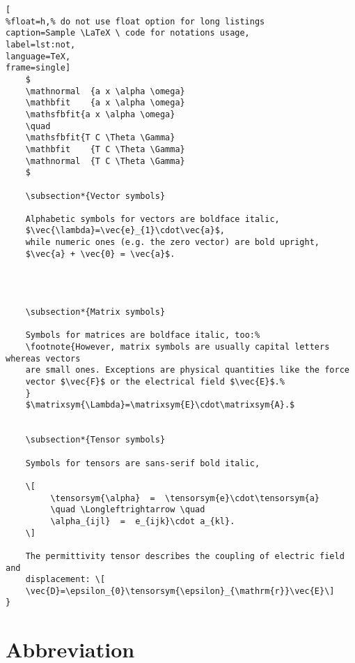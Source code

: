\begin{lstlisting}[
%float=h,% do not use float option for long listings
caption=Sample \LaTeX \ code for notations usage, 
label=lst:not,
language=TeX,
frame=single]
	$
	\mathnormal  {a x \alpha \omega}
	\mathbfit    {a x \alpha \omega}
	\mathsfbfit{a x \alpha \omega}
	\quad
	\mathsfbfit{T C \Theta \Gamma}
	\mathbfit    {T C \Theta \Gamma}
	\mathnormal  {T C \Theta \Gamma}
	$

	\subsection*{Vector symbols}

	Alphabetic symbols for vectors are boldface italic,
	$\vec{\lambda}=\vec{e}_{1}\cdot\vec{a}$,
	while numeric ones (e.g. the zero vector) are bold upright,
	$\vec{a} + \vec{0} = \vec{a}$.




	\subsection*{Matrix symbols}

	Symbols for matrices are boldface italic, too:%
	\footnote{However, matrix symbols are usually capital letters whereas vectors
	are small ones. Exceptions are physical quantities like the force
	vector $\vec{F}$ or the electrical field $\vec{E}$.%
	}
	$\matrixsym{\Lambda}=\matrixsym{E}\cdot\matrixsym{A}.$


	\subsection*{Tensor symbols}

	Symbols for tensors are sans-serif bold italic,

	\[
		 \tensorsym{\alpha}  =  \tensorsym{e}\cdot\tensorsym{a}
		 \quad \Longleftrightarrow \quad
		 \alpha_{ijl}  =  e_{ijk}\cdot a_{kl}.
	\]

	The permittivity tensor describes the coupling of electric field and
	displacement: \[
	\vec{D}=\epsilon_{0}\tensorsym{\epsilon}_{\mathrm{r}}\vec{E}\]
}

\end{lstlisting}
\cleardoublepage











\newpage
\section{Abbreviation}\
\label{sec:abbrv}

